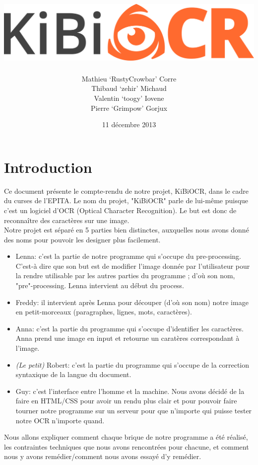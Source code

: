 \documentclass[12pt]{report}
\title{\includegraphics[scale=0.55]{chapters/Pictures/kibi.png}}
\author{Mathieu `RustyCrowbar' Corre \\
        Thibaud `zehir' Michaud \\
        Valentin `toogy' Iovene \\
        Pierre `Grimpow' Gorjux
      }
\date{11 décembre 2013}
\begin{document}
\maketitle

\tableofcontents

\chapter*{Introduction}

Ce document présente le compte-rendu de notre projet, KiBiOCR, dans le cadre du
curses de l'EPITA. Le nom du projet, "KiBiOCR" parle de lui-même puisque c'est
un logiciel d'OCR (Optical Character Recognition). Le but est donc de
reconnaître des caractères sur une image. \\

Notre projet est séparé en 5 parties bien distinctes, auxquelles nous avons
donné des noms pour pouvoir les designer plus facilement.

\begin{itemize}
    \item{Lenna}: c'est la partie de notre programme qui s'occupe du
      pre-processing. C'est-à dire que son but est de modifier l'image donnée
      par l'utilisateur pour la rendre utilisable par les autres parties du
      programme ; d'où son nom, "pre"-processing. Lenna intervient au début du
      process. 
    \item{Freddy}: il intervient après Lenna pour découper (d'où son nom) notre
      image en petit-morceaux (paragraphes, lignes, mots, caractères).
    \item{Anna}: c'est la partie du programme qui s'occupe d'identifier les
      caractères. Anna prend une image en input et retourne un caratères
      correspondant à l'image.
    \item{\emph{(Le petit)} Robert}: c'est la partie du programme qui s'occupe
      de la correction syntaxique de la langue du document. 
    \item{Guy}: c'est l'interface entre l'homme et la machine. Nous avons décidé
      de la faire en HTML/CSS pour avoir un rendu plus clair et pour pouvoir
      faire tourner notre programme sur un serveur pour que n'importe qui puisse
      tester notre OCR n'importe quand.
\end{itemize}

Nous allons expliquer comment chaque brique de notre programme a été réalisé,
les contraintes techniques que nous avons rencontrées pour chacune, et comment
nous y avons remédier/comment nous avons essayé d'y remédier. \\
\end{document}
